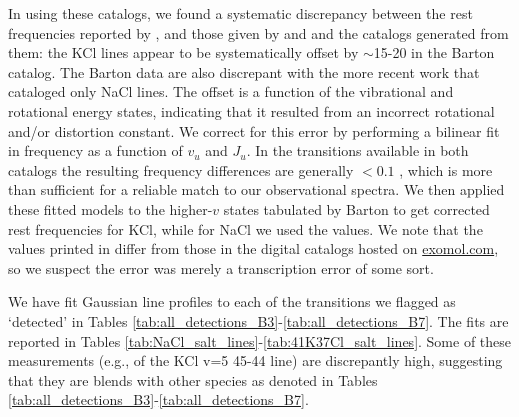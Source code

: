\documentclass[twocolumn]{aastex62}
\begin{document}
In using these catalogs, we found a systematic discrepancy between the rest
frequencies reported by \citet{Barton2014a}, and those given by
\citet{Caris2004a} and \citet{Caris2002a} and the catalogs generated from them:
the KCl lines appear to be systematically offset by $\sim$15-20 \kms in the
Barton catalog.  The Barton data are also discrepant with the more recent
\citet{Cabezas2016a} work that cataloged only NaCl lines. The offset is a
function of the vibrational and rotational energy states, indicating that it
resulted from an incorrect rotational and/or distortion constant.  We correct
for this error by performing a bilinear fit in frequency as a function of $v_u$
and $J_u$.  In the transitions available in both catalogs the resulting
frequency differences are generally $<0.1$ \kms, which is more than sufficient
for a reliable match to our observational spectra.  We then applied these
fitted models to the higher-$v$ states tabulated by Barton to get corrected
rest frequencies for KCl, while for NaCl we used the \citet{Cabezas2016a}
values.  We note that the values printed in \citet{Barton2014a} differ from
those in the digital catalogs hosted on \url{exomol.com}, so we suspect the
error was merely a transcription error of some sort.







We have fit Gaussian line profiles to each of the transitions we flagged as
`detected' in Tables \ref{tab:all_detections_B3}-\ref{tab:all_detections_B7}.
The fits are reported in Tables
\ref{tab:NaCl_salt_lines}-\ref{tab:41K37Cl_salt_lines}.  Some of these
measurements (e.g., of the KCl v=5 45-44 line) are discrepantly
high, suggesting that they are blends with other species as denoted in 
Tables \ref{tab:all_detections_B3}-\ref{tab:all_detections_B7}.
\end{document}
